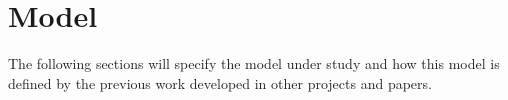 \chapter{Model} \label{sec:model}

The following sections will specify the model under study and how this model is defined by the previous work developed in other projects and papers.